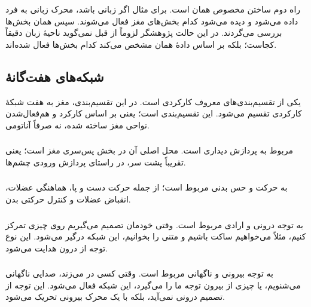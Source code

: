 راه دوم ساختن  مخصوص همان  است. برای مثال اگر  زبانی باشد، محرک زبانی به فرد داده می‌شود و دیده می‌شود کدام بخش‌های مغز فعال می‌شوند. سپس همان بخش‌ها بررسی می‌گردند. در این حالت پژوهشگر لزوماً از قبل نمی‌گوید ناحیهٔ زبان دقیقاً کجاست؛ بلکه بر اساس دادهٔ همان  مشخص می‌کند کدام بخش‌ها فعال شده‌اند.

\subsection{شبکه‌های هفت‌گانهٔ }
 یکی از تقسیم‌بندی‌های معروف کارکردی است. در این تقسیم‌بندی، مغز به هفت شبکهٔ کارکردی تقسیم می‌شود. این تقسیم‌بندی  است؛ یعنی بر اساس کارکرد و هم‌فعال‌شدن نواحی مغز ساخته شده، نه صرفاً آناتومی.


\subsubsection{}
 مربوط به پردازش دیداری است. محل اصلی آن در بخش پس‌سری مغز است؛ یعنی تقریباً پشت سر، در راستای پردازش ورودی چشم‌ها.

\subsubsection{}
 به حرکت و حس بدنی مربوط است؛ از جمله حرکت دست و پا، هماهنگی عضلات، انقباض عضلات و کنترل حرکتی بدن.

\subsubsection{}
 به توجه درونی و ارادی مربوط است. وقتی خودمان تصمیم می‌گیریم روی چیزی تمرکز کنیم، مثلاً می‌خواهیم ساکت باشیم و متنی را بخوانیم، این شبکه درگیر می‌شود. این نوع توجه از درون هدایت می‌شود.

\subsubsection{}
 به توجه بیرونی و ناگهانی مربوط است. وقتی کسی در می‌زند، صدایی ناگهانی می‌شنویم، یا چیزی از بیرون توجه ما را می‌گیرد، این شبکه فعال می‌شود. این توجه از تصمیم درونی نمی‌آید، بلکه با یک محرک بیرونی تحریک می‌شود.

